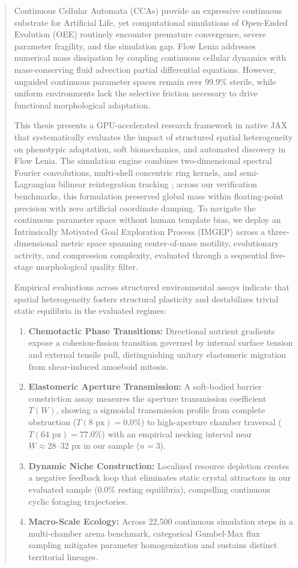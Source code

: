 \begin{abstract}
Continuous Cellular Automata (CCAs) provide an expressive continuous substrate for Artificial Life, yet computational simulations of Open-Ended Evolution (OEE) routinely encounter premature convergence, severe parameter fragility, and the simulation gap. Flow Lenia addresses numerical mass dissipation by coupling continuous cellular dynamics with mass-conserving fluid advection partial differential equations. However, unguided continuous parameter spaces remain over 99.9\% sterile, while uniform environments lack the selective friction necessary to drive functional morphological adaptation.

This thesis presents a GPU-accelerated research framework in native JAX that systematically evaluates the impact of structured spatial heterogeneity on phenotypic adaptation, soft biomechanics, and automated discovery in Flow Lenia. The simulation engine combines two-dimensional spectral Fourier convolutions, multi-shell concentric ring kernels, and semi-Lagrangian bilinear reintegration tracking \parencite{moroz2020reintegration, plantec2025flowlenia}; across our verification benchmarks, this formulation preserved global mass within floating-point precision with zero artificial coordinate damping. To navigate the continuous parameter space without human template bias, we deploy an Intrinsically Motivated Goal Exploration Process (IMGEP) across a three-dimensional metric space spanning center-of-mass motility, evolutionary activity, and compression complexity, evaluated through a sequential five-stage morphological quality filter.

Empirical evaluations across structured environmental assays indicate that spatial heterogeneity fosters structural plasticity and destabilizes trivial static equilibria in the evaluated regimes:
\begin{enumerate}
    \item \textbf{Chemotactic Phase Transitions:} Directional nutrient gradients expose a cohesion-fission transition governed by internal surface tension and external tensile pull, distinguishing unitary elastomeric migration from shear-induced amoeboid mitosis.
    \item \textbf{Elastomeric Aperture Transmission:} A soft-bodied barrier constriction assay measures the aperture transmission coefficient $T(W)$, showing a sigmoidal transmission profile from complete obstruction ($T(8\text{ px}) = 0.0\%$) to high-aperture chamber traversal ($T(64\text{ px}) = 77.0\%$) with an empirical necking interval near $W \approx 28\text{--}32\text{ px}$ in our sample ($n=3$).
    \item \textbf{Dynamic Niche Construction:} Localized resource depletion creates a negative feedback loop that eliminates static crystal attractors in our evaluated sample ($0.0\%$ resting equilibria), compelling continuous cyclic foraging trajectories.
    \item \textbf{Macro-Scale Ecology:} Across 22,500 continuous simulation steps in a multi-chamber arena benchmark, categorical Gumbel-Max flux sampling mitigates parameter homogenization and sustains distinct territorial lineages.
\end{enumerate}


\end{abstract}
